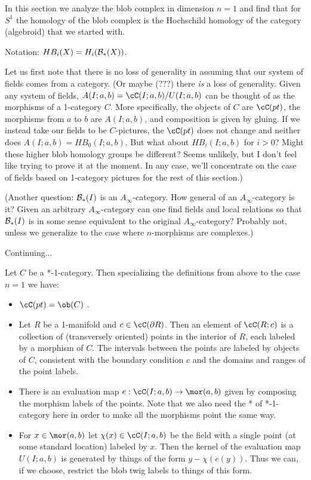 In this section we analyze the blob complex in dimension $n=1$
and find that for $S^1$ the homology of the blob complex is the
Hochschild homology of the category (algebroid) that we started with.

Notation: $HB_i(X) = H_i({\mathcal B}_*(X))$.

Let us first note that there is no loss of generality in assuming that our system of
fields comes from a category.
(Or maybe (???) there {\it is} a loss of generality.
Given any system of fields, $A(I; a, b) = \cC(I; a, b)/U(I; a, b)$ can be
thought of as the morphisms of a 1-category $C$.
More specifically, the objects of $C$ are $\cC(pt)$, the morphisms from $a$ to $b$
are $A(I; a, b)$, and composition is given by gluing.
If we instead take our fields to be $C$-pictures, the $\cC(pt)$ does not change
and neither does $A(I; a, b) = HB_0(I; a, b)$.
But what about $HB_i(I; a, b)$ for $i > 0$?
Might these higher blob homology groups be different?
Seems unlikely, but I don't feel like trying to prove it at the moment.
In any case, we'll concentrate on the case of fields based on 1-category
pictures for the rest of this section.)

(Another question: ${\mathcal B}_*(I)$ is an $A_\infty$-category.
How general of an $A_\infty$-category is it?
Given an arbitrary $A_\infty$-category can one find fields and local relations so
that ${\mathcal B}_*(I)$ is in some sense equivalent to the original $A_\infty$-category?
Probably not, unless we generalize to the case where $n$-morphisms are complexes.)

Continuing...

Let $C$ be a *-1-category.
Then specializing the definitions from above to the case $n=1$ we have:
\begin{itemize}
\item $\cC(pt) = \ob(C)$ .
\item Let $R$ be a 1-manifold and $c \in \cC(\bd R)$.
Then an element of $\cC(R; c)$ is a collection of (transversely oriented)
points in the interior
of $R$, each labeled by a morphism of $C$.
The intervals between the points are labeled by objects of $C$, consistent with
the boundary condition $c$ and the domains and ranges of the point labels.
\item There is an evaluation map $e: \cC(I; a, b) \to \mor(a, b)$ given by
composing the morphism labels of the points.
Note that we also need the * of *-1-category here in order to make all the morphisms point
the same way.
\item For $x \in \mor(a, b)$ let $\chi(x) \in \cC(I; a, b)$ be the field with a single
point (at some standard location) labeled by $x$.
Then the kernel of the evaluation map $U(I; a, b)$ is generated by things of the
form $y - \chi(e(y))$.
Thus we can, if we choose, restrict the blob twig labels to things of this form.
\end{itemize}

